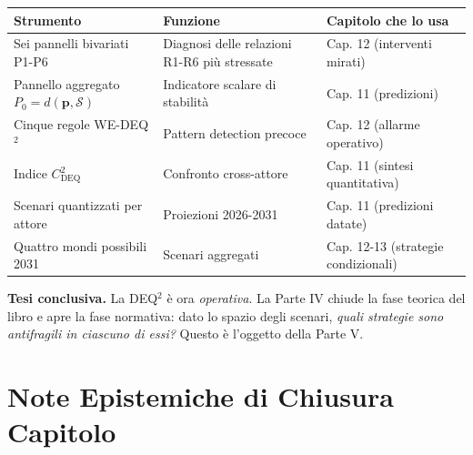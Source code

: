 {\def\LTcaptype{none} %
{\small\begin{longtable}[]{@{}
  >{\raggedright\arraybackslash}p{}
  >{\raggedright\arraybackslash}p{}
  >{\raggedright\arraybackslash}p{}@{}}
\toprule\noalign{}
\begin{minipage}[b]{\linewidth}\raggedright
Strumento
\end{minipage} & \begin{minipage}[b]{\linewidth}\raggedright
Funzione
\end{minipage} & \begin{minipage}[b]{\linewidth}\raggedright
Capitolo che lo usa
\end{minipage} \\
\midrule\noalign{}
\endhead
\bottomrule\noalign{}
\endlastfoot
Sei pannelli bivariati P1-P6 & Diagnosi delle relazioni R1-R6 più
stressate & Cap. 12 (interventi mirati) \\
Pannello aggregato \(P_0 = d(\boldsymbol{p}, \mathcal{S})\) & Indicatore
scalare di stabilità & Cap. 11 (predizioni) \\
Cinque regole WE-DEQ$^2$ & Pattern detection precoce & Cap. 12 (allarme
operativo) \\
Indice \(C_{\text{DEQ}}^2\) & Confronto cross-attore & Cap. 11 (sintesi
quantitativa) \\
Scenari quantizzati per attore & Proiezioni 2026-2031 & Cap. 11
(predizioni datate) \\
Quattro mondi possibili 2031 & Scenari aggregati & Cap. 12-13 (strategie
condizionali) \\
\end{longtable}}
}

\Hypoth{} \textbf{Tesi conclusiva.} La DEQ$^2$ è ora \emph{operativa}. La
Parte IV chiude la fase teorica del libro e apre la fase normativa: dato
lo spazio degli scenari, \emph{quali strategie sono antifragili in
ciascuno di essi?} Questo è l'oggetto della Parte V.



\section{Note Epistemiche di Chiusura
Capitolo}\label{note-epistemiche-di-chiusura-capitolo}

